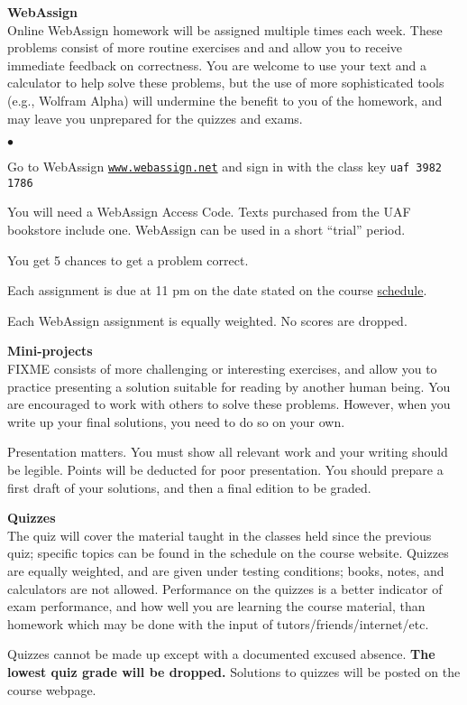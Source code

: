 \documentclass[12pt]{article}
\renewcommand{\emph}[1]{\textsf{\textbf{#1}}}
\newcommand{\localhead}[1]{\par\smallskip\textbf{#1}\nobreak\\}%
\def\heading#1{\localhead{\large\emph{#1}}}
\def\subheading#1{\localhead{\emph{#1}}}
\newenvironment{clist}%
{\bgroup\parskip 0pt\begin{list}{$\bullet$}{\partopsep 4pt\topsep 0pt\itemsep -2pt}}%
{\end{list}\egroup}%
\begin{document}
\subheading{WebAssign} 
Online WebAssign homework will be assigned multiple times each week.  These problems consist of more routine exercises and and allow you to receive immediate feedback on correctness.  You are welcome to use your text and a calculator to help solve these problems, but the use of more sophisticated tools (e.g., Wolfram Alpha) will undermine the benefit to you of the homework, and may leave you unprepared for the quizzes and exams.

\begin{clist}
\item Go to WebAssign \href{https://www.webassign.net/}{\tt www.webassign.net} and sign in with the class key \quad \texttt{uaf 3982 1786}
\item You will need a WebAssign Access Code.  Texts purchased from the UAF bookstore include one.  WebAssign can be used in a short ``trial'' period.
\item You get 5 chances to get a problem correct. 
\item Each assignment is due at 11 pm on the date stated on the course \href{https://bueler.github.io/math302/schedule.pdf}{schedule}. 
\item Each WebAssign assignment is equally weighted. No scores are dropped.
\end{clist}


\subheading{Mini-projects}
FIXME consists of more challenging or interesting exercises, and allow you to practice presenting  a solution suitable for reading by another human being. You are encouraged to work with others to solve these problems.  However, when you write up your final solutions, you need to do so on your own.

Presentation matters. You must show all relevant work and your writing should be legible.  Points will be deducted for poor presentation.  You should prepare a first draft of your solutions, and then a final edition to be graded.


\heading{Quizzes}
The quiz will cover the material taught in the classes held since the previous quiz; specific topics can be found in the schedule on the course website.  Quizzes are equally weighted, and are given under testing conditions; books, notes, and calculators are not allowed.  Performance on the quizzes is a better indicator of exam performance, and how well you are learning the course material, than homework which may be done with the input of tutors/friends/internet/etc.

Quizzes cannot be made up except with a documented excused absence.  \emph{The lowest quiz grade will be dropped.}  Solutions to quizzes will be posted on the course webpage.
\end{document}
